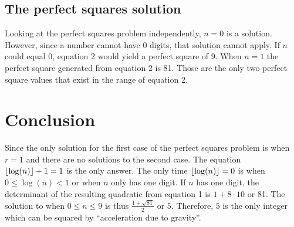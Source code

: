 \documentclass[a4paper, 12pt]{article}
\begin{document}
\subsection{The perfect squares solution}
Looking at the perfect squares problem independently, $n=0$ is a solution. However, since a number cannot have 0 digits, that solution cannot apply. If $n$ could equal $0$, equation 2 would yield a perfect square of 9. When $n=1$ the perfect square generated from equation 2 is 81. Those are the only two perfect square values that exist in the range of equation 2.
\section{Conclusion}
Since the only solution for the first case of the perfect squares problem is when $r=1$ and there are no solutions to the second case. The equation $\lfloor\log(n)\rfloor+1=1$ is the only answer. The only time $\lfloor\log(n)\rfloor=0$ is when $0\leq\log(n)<1$ or when $n$ only has one digit. If $n$ has one digit, the determinant of the resulting quadratic from equation 1 is $1+8\cdot10$ or 81. The solution to when $0\leq n \leq 9$ is thus $\frac{1+\sqrt{81}}{2}$ or $5$. Therefore, $5$ is the only integer which can be squared by ``acceleration due to gravity''.
\end{document}
